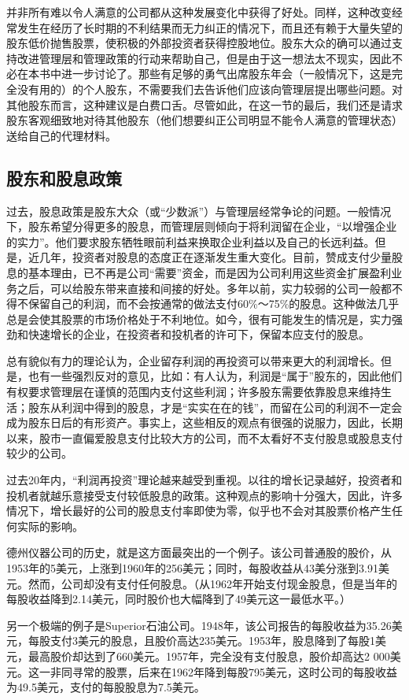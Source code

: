 \documentclass[12pt,oneside]{book}
\begin{document}
并非所有难以令人满意的公司都从这种发展变化中获得了好处。同样，这种改变经常发生在经历了长时期的不利结果而无力纠正的情况下，而且还有赖于大量失望的股东低价抛售股票，使积极的外部投资者获得控股地位。股东大众的确可以通过支持改进管理层和管理政策的行动来帮助自己，但是由于这一想法太不现实，因此不必在本书中进一步讨论了。那些有足够的勇气出席股东年会（一般情况下，这是完全没有用的）的个人股东，不需要我们去告诉他们应该向管理层提出哪些问题。对其他股东而言，这种建议是白费口舌。尽管如此，在这一节的最后，我们还是请求股东客观细致地对待其他股东（他们想要纠正公司明显不能令人满意的管理状态）送给自己的代理材料。

\subsection{股东和股息政策}
过去，股息政策是股东大众（或“少数派”）与管理层经常争论的问题。一般情况下，股东希望分得更多的股息，而管理层则倾向于将利润留在企业，“以增强企业的实力”。他们要求股东牺牲眼前利益来换取企业利益以及自己的长远利益。但是，近几年，投资者对股息的态度正在逐渐发生重大变化。目前，赞成支付少量股息的基本理由，已不再是公司“需要”资金，而是因为公司利用这些资金扩展盈利业务之后，可以给股东带来直接和间接的好处。多年以前，实力较弱的公司一般都不得不保留自己的利润，而不会按通常的做法支付60\%～75\%的股息。这种做法几乎总是会使其股票的市场价格处于不利地位。如今，很有可能发生的情况是，实力强劲和快速增长的企业，在投资者和投机者的许可下，保留本应支付的股息。

总有貌似有力的理论认为，企业留存利润的再投资可以带来更大的利润增长。但是，也有一些强烈反对的意见，比如：有人认为，利润是“属于”股东的，因此他们有权要求管理层在谨慎的范围内支付这些利润；许多股东需要依靠股息来维持生活；股东从利润中得到的股息，才是“实实在在的钱”，而留在公司的利润不一定会成为股东日后的有形资产。事实上，这些相反的观点有很强的说服力，因此，长期以来，股市一直偏爱股息支付比较大方的公司，而不太看好不支付股息或股息支付较少的公司。

过去20年内，“利润再投资”理论越来越受到重视。以往的增长记录越好，投资者和投机者就越乐意接受支付较低股息的政策。这种观点的影响十分强大，因此，许多情况下，增长最好的公司的股息支付率即使为零，似乎也不会对其股票价格产生任何实际的影响。

德州仪器公司的历史，就是这方面最突出的一个例子。该公司普通股的股价，从1953年的5美元，上涨到1960年的256美元；同时，每股收益从43美分涨到3.91美元。然而，公司却没有支付任何股息。（从1962年开始支付现金股息，但是当年的每股收益降到2.14美元，同时股价也大幅降到了49美元这一最低水平。）

另一个极端的例子是Superior石油公司。1948年，该公司报告的每股收益为35.26美元，每股支付3美元的股息，且股价高达235美元。1953年，股息降到了每股1美元，最高股价却达到了660美元。1957年，完全没有支付股息，股价却高达2 000美元。这一非同寻常的股票，后来在1962年降到每股795美元，这时公司的每股收益为49.5美元，支付的每股股息为7.5美元。
\end{document}
